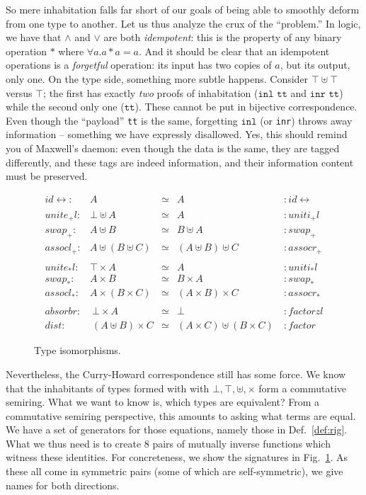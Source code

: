 \documentclass{article}
\newcommand{\identlp}{\mathit{unite}_+\mathit{l}}
\newcommand{\identrp}{\mathit{uniti}_+\mathit{l}}
\newcommand{\swapp}{\mathit{swap}_+}
\newcommand{\assoclp}{\mathit{assocl}_+}
\newcommand{\assocrp}{\mathit{assocr}_+}
\newcommand{\identlt}{\mathit{unite}_*\mathit{l}}
\newcommand{\identrt}{\mathit{uniti}_*\mathit{l}}
\newcommand{\swapt}{\mathit{swap}_*}
\newcommand{\assoclt}{\mathit{assocl}_*}
\newcommand{\assocrt}{\mathit{assocr}_*}
\newcommand{\factorzl}{\mathit{factorzl}}
\newcommand{\dist}{\mathit{dist}}
\newcommand{\factor}{\mathit{factor}}
\newcommand{\distz}{\mathit{absorbr}}
\newcommand{\idc}{\mathit{id}\!\!\leftrightarrow}
\begin{document}
So mere inhabitation falls far short of our goals of being able to
smoothly deform from one type to another. Let us thus analyze the crux
of the ``problem.'' In logic, we have that $\land$ and $\lor$ are both
\emph{idempotent}: this is the property of any binary operation $*$
where $\forall a. a * a = a$. And it should be clear that an
idempotent operations is a \emph{forgetful} operation: its input has
two copies of $a$, but its output, only one. On the type side,
something more subtle happens. Consider $\top \uplus \top$
versus $\top$; the first has exactly \emph{two} proofs of inhabitation
($\texttt{inl tt}$ and $\texttt{inr tt}$) while the second only one
($\texttt{tt}$). These cannot be put in bijective correspondence. Even
though the ``payload'' \texttt{tt} is the same, forgetting
$\texttt{inl}$ (or \texttt{inr}) throws away information -- something
we have expressly disallowed.  Yes, this should remind you of
Maxwell's daemon: even though the data is the same, they are tagged
differently, and these tags are indeed information, and their
information content must be preserved.

\begin{figure}[t]
\[
\begin{array}{rrcll}
\idc :& A & \simeq & A &: \idc \\
\\
\identlp :&  \bot \uplus A & \simeq & A &: \identrp \\
\swapp :&  A \uplus B & \simeq & B \uplus A &: \swapp \\
\assoclp :&  A \uplus (B \uplus C) & \simeq & (A \uplus B) \uplus C &: \assocrp \\
\\
\identlt :&  \top \times A & \simeq & A &: \identrt \\
\swapt :&  A \times B & \simeq & B \times A &: \swapt \\
\assoclt :&  A \times (B \times C) & \simeq & (A \times B) \times C &: \assocrt \\
\\
\distz :&~ \bot \times A & \simeq & \bot ~ &: \factorzl \\
\dist :&~ (A \uplus B) \times C & \simeq & (A \times C) \uplus (B \times C)~ &: \factor
\end{array}
\]
\caption{Type isomorphisms.}
\label{type-isos}
\end{figure}

Nevertheless, the Curry-Howard correspondence still has some force. We
know that the inhabitants of types formed with with
$\bot, \top, \uplus, \times$ form a commutative semiring. What we want
to know is, which types are equivalent? From a commutative semiring
perspective, this amounts to asking what terms are equal.  We have a
set of generators for those equations, namely those in
Def.~\ref{def:rig}. What we thus need is to create $8$ pairs of
mutually inverse functions which witness these identities.  For
concreteness, we show the signatures in Fig.~\ref{type-isos}.  As
these all come in symmetric pairs (some of which are self-symmetric),
we give names for both directions. 
\end{document}
